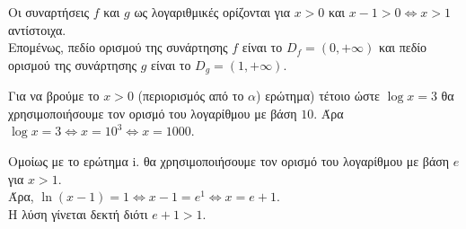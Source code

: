 \begin{alist}
\item Οι συναρτήσεις $f$ και $g$ ως λογαριθμικές ορίζονται για $x > 0$ και $x - 1 > 0 \Leftrightarrow x > 1$ αντίστοιχα. \\
Επομένως, πεδίο ορισμού της συνάρτησης $f$ είναι το $D_f = (0, +\infty)$ και πεδίο ορισμού της συνάρτησης $g$ είναι το $D_g = (1, +\infty)$.
\item 
\begin{rlist}
\item Για να βρούμε το $x>0$ (περιορισμός από το $\alpha$) ερώτημα) τέτοιο ώστε $\log x = 3$ θα χρησιμοποιήσουμε τον ορισμό του λογαρίθμου με βάση $10$. Άρα $\log x = 3 \Leftrightarrow x = 10^3 \Leftrightarrow x = 1000$.
\item Ομοίως με το ερώτημα $\text{i.}$ θα χρησιμοποιήσουμε τον ορισμό του λογαρίθμου με βάση $e$ για $x>1$. \\
Άρα, $\ln(x - 1) = 1 \Leftrightarrow x - 1 = e^1 \Leftrightarrow x = e + 1$. \\
Η λύση γίνεται δεκτή διότι $e + 1 > 1$.
\end{rlist}
\end{alist}

